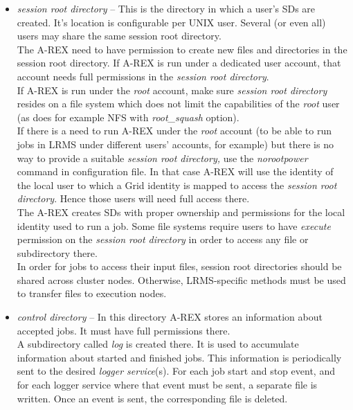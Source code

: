 \documentclass{article}                            %
\begin{document}
\begin{itemize}
\item \textit{session root directory} -- This is the directory in which a
user's SDs are created. It's location is configurable per UNIX user.
Several (or even all) users may share the same session root directory.\\
The A-REX need to have permission to create new files and directories
in the session root directory. If A-REX is run under a dedicated user
account, that account needs full permissions in the \textit{session
root directory}.\\
If A-REX is run under the \emph{root} account, make sure \textit{session
root directory} resides on a file system which does not limit the
capabilities of the \emph{root} user (as does for example NFS with
\emph{root\_squash} option).\\
If there is a need to run A-REX under the \emph{root} account (to
be able to run jobs in LRMS under different users' accounts, for example)
but there is no way to provide a suitable \textit{session root directory,}
use the \emph{norootpower} command in configuration file. In that
case A-REX will use the identity of the local user to which a Grid
identity is mapped to access the \textit{session root directory}.
Hence those users will need full access there.\\
The A-REX creates SDs with proper ownership and permissions for the
local identity used to run a job. Some file systems require users
to have \emph{execute} permission on the \textit{session root directory}
in order to access any file or subdirectory there.\\
In order for jobs to access their input files, session root directories
should be shared across cluster nodes. Otherwise, LRMS-specific methods
must be used to transfer files to execution nodes. 
\end{itemize}

\begin{itemize}
\item \textit{control directory} -- In this directory A-REX stores an information
about accepted jobs. It must have full permissions there.\\
A subdirectory called \textit{log} is created there. It is used to
accumulate information about started and finished jobs. This information
is periodically sent to the desired \emph{logger service}(s). For
each job start and stop event, and for each logger service where that
event must be sent, a separate file is written. Once an event is sent,
the corresponding file is deleted.
\end{itemize}
\end{document}
